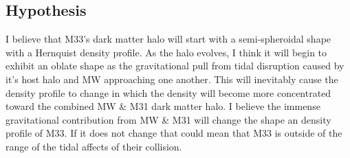 \documentclass[fleqn,usenatbib]{mnras}
\begin{document}
\subsection{Hypothesis}
I believe that M33's dark matter halo will start with a semi-spheroidal shape with a Hernquist density profile. As the halo evolves, I think it will begin to exhibit an oblate shape as the gravitational pull from tidal disruption caused by it's host halo and MW approaching one another. This will inevitably cause the density profile to change in which the density will become more concentrated toward the combined MW \& M31 dark matter halo. I believe the immense gravitational contribution from MW \& M31 will change the shape an density profile of M33. If it does not change that could mean that M33 is outside of the range of the tidal affects of their collision.   


 



\bsp	%
\label{lastpage}
\end{document}
